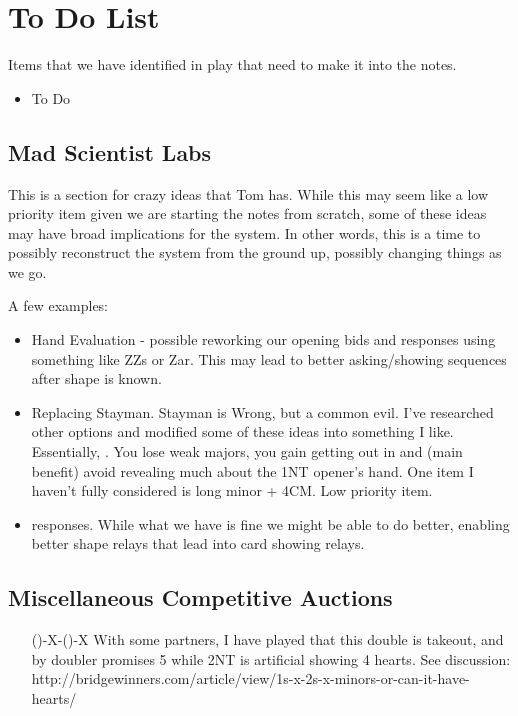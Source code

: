 \documentclass[tom-ari]{subfile}
\begin{document}
	
	\chapter{To Do List}
	
	Items that we have identified in play that need to make it into the notes.
	\begin{itemize}
		\item To Do
	\end{itemize}

	\section{Mad Scientist Labs}
	
	This is a section for crazy ideas that Tom has.  While this may seem like a low priority item given we are starting the notes from scratch, some of these ideas may have broad implications for the system.  In other words, this is a time to possibly reconstruct the system from the ground up, possibly changing things as we go.
	
	A few examples:
	
	\begin{itemize}
		\item Hand Evaluation - possible reworking our opening bids and responses using something like ZZs or Zar.  This may lead to better asking/showing sequences after shape is known.
		\item Replacing Stayman.  Stayman is Wrong, but a common evil.  I've researched other options and modified some of these ideas into something I like.  Essentially, \rightarrow{}.  You lose weak majors, you gain getting out in  and (main benefit) avoid revealing much about the 1NT opener's hand.  One item I haven't fully considered is long minor + 4CM.  Low priority item.
		\item {} responses.  While what we have is fine we might be able to do better, enabling better shape relays that lead into card showing relays.
	\end{itemize}

         \section{Miscellaneous Competitive Auctions}
         \begin{itemize}
             \item[(\sp1)-X-(\sp2)-X] With some partners, I have played that this double is takeout, and  by doubler promises 5 \heartsuit while 2NT is artificial showing 4 hearts. See discussion: http://bridgewinners.com/article/view/1s-x-2s-x-minors-or-can-it-have-hearts/
              
         \end{itemize}
	
\end{document}
